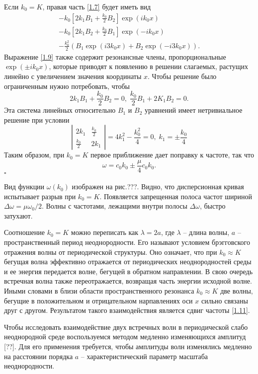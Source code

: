 Если $k_0=K$, правая часть \eqref{1.7} будет иметь вид
\begin{multline}\label{1.9}
-k_0\left[2k_1B_1+\frac{k_0}{2}B_2\right]\exp(ik_0x)\\
-k_0\left[2k_1B_2+\frac{k_0}{2}B_1\right]\exp(-ik_0x)\\
-\frac{k_0^2}{2}\left(B_1\exp(i3k_0x)+B_2\exp(-i3k_0x)\right).
\end{multline}
Выражение \eqref{1.9} также содержит резонансные члены, пропорциональные $\exp(\pm ik_0x)$, которые приводят к появлению в решении слагаемых, растущих линейно с увеличением значения координаты $x$. Чтобы решение было ограниченным нужно потребовать, чтобы
$$
2k_1B_1+\frac{k_0}{2}B_2=0, \; \frac{k_0}{2}B_1+2K_1B_2=0.
$$
Эта система линейных относительно $B_1$ и $B_2$ уравнений имеет нетривиальное решение при условии
\begin{equation}\label{1.10}
\left|
\begin{array}{cc}
2k_1 & \frac{k_0}{2} \\
\frac{k_0}{2} & 2k_1
\end{array}
\right|=4k_1^2-\frac{k_0^2}{4}=0,\;
k_1=\pm \frac{k_0}{4}
\end{equation}
Таким образом, при $k_0=K$ первое приближение дает поправку к частоте, так что
\begin{equation}\label{1.11}
\omega=c_0k_0 \pm \frac{\mu}{4}c_0k_0.
\end{equation}
$\square$

Вид функции $\omega(k_0)$ изображен на рис.???. Видно, что дисперсионная кривая испытывает разрыв при $k_0=K$. Появляется запрещенная полоса частот шириной $\Delta\omega=\mu\omega_0/2$. Волны с частотами, лежащими внутри полосы $\Delta\omega$, быстро затухают.

Соотношение $k_0=K$ можно переписать как $\lambda=2a$, где $\lambda$ -- длина волны, $a$ -- пространственный период неоднородности. Его называют условием брэгговского отражения волны от периодической структуры. Оно означает, что при $k_0\approx K$ бегущая волна эффективно отражается от периодических неоднородностей среды и ее энергия передается волне, бегущей в обратном направлении. В свою очередь встречная волна также переотражается, возвращая часть энергии исходной волне. Иными словами в близи области пространственного резонанса $k_0\approx K$ две волны, бегущие в положительном и отрицательном нарпавлениях оси $x$ сильно связаны друг с другом. Результатом такого взаимодействия является сдвиг частоты \eqref{1.11}.

Чтобы исследовать взаимодействие двух встречных волн в периодической слабо неоднородной среде воспользуемся методом медленно изменяющихся амплитуд [??]. Для его применения требуется, чтобы амплитуды волн изменялись медленно на расстоянии порядка $a$ -- характеристический параметр масштаба неоднородности.

